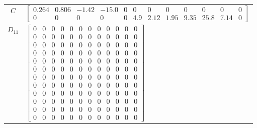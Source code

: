\begin{tabular}{cl}
   $C$    & $\left[\begin{array}{cccccccccccc}0.264 & 0.806 & -1.42 & -15.0 & 0 & 0 & 0 & 0 & 0 & 0 & 0 & 0\\0 & 0 & 0 & 0 & 0 & 4.9 & 2.12 & 1.95 & 9.35 & 25.8 & 7.14 & 0\end{array}\right]$                                                                                                                                                                                                                                                                                                                                                                                                                                                                                                                         \\
 $D_{11}$ & $\left[\begin{array}{cccccccccccc}0 & 0 & 0 & 0 & 0 & 0 & 0 & 0 & 0 & 0 & 0 & 0\\0 & 0 & 0 & 0 & 0 & 0 & 0 & 0 & 0 & 0 & 0 & 0\\0 & 0 & 0 & 0 & 0 & 0 & 0 & 0 & 0 & 0 & 0 & 0\\0 & 0 & 0 & 0 & 0 & 0 & 0 & 0 & 0 & 0 & 0 & 0\\0 & 0 & 0 & 0 & 0 & 0 & 0 & 0 & 0 & 0 & 0 & 0\\0 & 0 & 0 & 0 & 0 & 0 & 0 & 0 & 0 & 0 & 0 & 0\\0 & 0 & 0 & 0 & 0 & 0 & 0 & 0 & 0 & 0 & 0 & 0\\0 & 0 & 0 & 0 & 0 & 0 & 0 & 0 & 0 & 0 & 0 & 0\\0 & 0 & 0 & 0 & 0 & 0 & 0 & 0 & 0 & 0 & 0 & 0\\0 & 0 & 0 & 0 & 0 & 0 & 0 & 0 & 0 & 0 & 0 & 0\\0 & 0 & 0 & 0 & 0 & 0 & 0 & 0 & 0 & 0 & 0 & 0\\0 & 0 & 0 & 0 & 0 & 0 & 0 & 0 & 0 & 0 & 0 & 0\end{array}\right]$                                                                    \\

\end{tabular}
